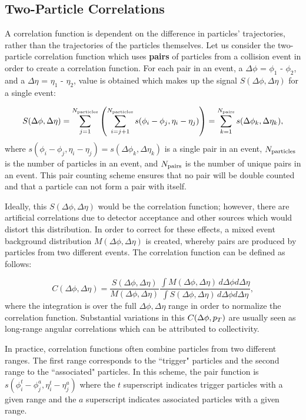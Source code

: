 \subsection{Two-Particle Correlations}
A correlation function is dependent on the difference in particles' trajectories, rather than the trajectories of the particles themselves. Let us consider the two-particle correlation function which uses \textbf{pairs} of particles from a collision event in order to create a correlation function. For each pair in an event, a $\Delta\phi$ = $\phi_1$ - $\phi_2$, and a $\Delta\eta$ = $\eta_1$ - $\eta_2$, value is obtained which makes up the signal $S(\Delta\phi,\Delta\eta)$ for a single event: 

\begin{equation}
  S(\Delta\phi,\Delta\eta) = \sum_{j=1}^{N_{\rm particles}}\left(\sum_{i=j+1}^{N_{\rm particles}}s(\phi_i - \phi_j,\eta_i - \eta_j)\right)=\sum_{k=1}^{N_{\rm pairs}}s(\Delta\phi_k,\Delta\eta_k),
\end{equation}
where $s(\phi_i - \phi_j,\eta_i - \eta_j) = s(\Delta\phi_k,\Delta\eta_k)$ is a single pair in an event, $N_{\rm particles}$ is the number of particles in an event, and $N_{\rm pairs}$ is the number of unique pairs in an event. This pair counting scheme ensures that no pair will be double counted and that a particle can not form a pair with itself.

Ideally, this $S(\Delta\phi,\Delta\eta)$ would be the correlation function; however, there are artificial correlations due to detector acceptance and other sources which would distort this distribution. In order to correct for these effects, a mixed event background distribution $M(\Delta\phi,\Delta\eta)$ is created, whereby pairs are produced by particles from two different events. The correlation function can be defined as follows:

\begin{equation}
  C(\Delta\phi,\Delta\eta) =
          \frac{S(\Delta\phi,\Delta\eta)}{M(\Delta\phi,\Delta\eta)} 
          \frac{\int M(\Delta\phi,\Delta\eta) \, d\Delta\phi d\Delta\eta}{\int S(\Delta\phi,\Delta\eta) \, d\Delta\phi d\Delta\eta},
  \label{eq:def_corr_function}
\end{equation}
where the integration is over the full $\Delta\phi,\Delta\eta$ range in order to normalize the correlation function. Substantial variations in this $C(\Delta\phi,\mbox{$p_T$})$ are usually seen as long-range angular correlations which can be attributed to collectivity.

In practice, correlation functions often combine particles from two different \pt ranges. The first \pt range corresponds to the ``trigger" particles and the second range to the ``associated" particles. In this scheme, the pair function is $s(\phi_i^t - \phi_j^a,\eta_i^t - \eta_j^a)$ where the $t$ superscript indicates trigger particles with a given \pt range and the $a$ superscript indicates associated particles with a given \pt range. 

